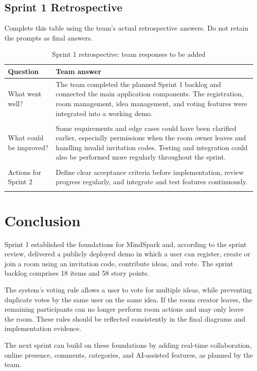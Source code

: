 \documentclass[12pt,a4paper]{report}
\begin{document}
\subsection{Sprint 1 Retrospective}
Complete this table using the team's actual retrospective answers. Do not retain the prompts as final answers.

\begin{table}[H]
\centering
\begin{tabularx}{\textwidth}{|p{}|Y|}\hline
\textbf{Question} & \textbf{Team answer} \\\hline
What went well? & The team completed the planned Sprint 1 backlog and connected the main application components. The registration, room management, idea management, and voting features were integrated into a working demo. \\\hline
 \\\hline
What could be improved? & Some requirements and edge cases could have been clarified earlier, especially permissions when the room owner leaves and handling invalid invitation codes. Testing and integration could also be performed more regularly throughout the sprint. \\\hline
 \\\hline
Actions for Sprint 2 & Define clear acceptance criteria before implementation, review progress regularly, and integrate and test features continuously.  \\\hline
 \\\hline
\end{tabularx}
\caption{Sprint 1 retrospective: team responses to be added}
\end{table}

\clearpage
\section{Conclusion}
Sprint 1 established the foundations for MindSpark and, according to the sprint review, delivered a publicly deployed demo in which a user can register, create or join a room using an invitation code, contribute ideas, and vote. The sprint backlog comprises 18 items and 58 story points.

The system's voting rule allows a user to vote for multiple ideas, while preventing duplicate votes by the same user on the same idea. If the room creator leaves, the remaining participants can no longer perform room actions and may only leave the room. These rules should be reflected consistently in the final diagrams and implementation evidence.

The next sprint can build on these foundations by adding real-time collaboration, online presence, comments, categories, and AI-assisted features, as planned by the team.
\end{document}
